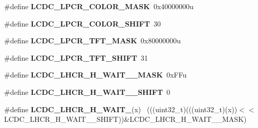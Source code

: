 \begin{DoxyCompactItemize}
\item 
\hypertarget{group___l_c_d_c___register___masks_gadccb426a3edf8c89ea121cc7a1a0bee0}{}\#define {\bfseries L\+C\+D\+C\+\_\+\+L\+P\+C\+R\+\_\+\+C\+O\+L\+O\+R\+\_\+\+M\+A\+S\+K}~0x40000000u\label{group___l_c_d_c___register___masks_gadccb426a3edf8c89ea121cc7a1a0bee0}

\item 
\hypertarget{group___l_c_d_c___register___masks_ga01b98c98ec74fae4a75c3742822b432d}{}\#define {\bfseries L\+C\+D\+C\+\_\+\+L\+P\+C\+R\+\_\+\+C\+O\+L\+O\+R\+\_\+\+S\+H\+I\+F\+T}~30\label{group___l_c_d_c___register___masks_ga01b98c98ec74fae4a75c3742822b432d}

\item 
\hypertarget{group___l_c_d_c___register___masks_gace729a6dbd0a31c98fca8936e1040e5a}{}\#define {\bfseries L\+C\+D\+C\+\_\+\+L\+P\+C\+R\+\_\+\+T\+F\+T\+\_\+\+M\+A\+S\+K}~0x80000000u\label{group___l_c_d_c___register___masks_gace729a6dbd0a31c98fca8936e1040e5a}

\item 
\hypertarget{group___l_c_d_c___register___masks_gaebd495e08e15f8cd18c888f83e993d13}{}\#define {\bfseries L\+C\+D\+C\+\_\+\+L\+P\+C\+R\+\_\+\+T\+F\+T\+\_\+\+S\+H\+I\+F\+T}~31\label{group___l_c_d_c___register___masks_gaebd495e08e15f8cd18c888f83e993d13}

\item 
\hypertarget{group___l_c_d_c___register___masks_ga3563da76663de89cdbccca8e7d50dbf0}{}\#define {\bfseries L\+C\+D\+C\+\_\+\+L\+H\+C\+R\+\_\+\+H\+\_\+\+W\+A\+I\+T\+\_\+\_\+\+M\+A\+S\+K}~0x\+F\+Fu\label{group___l_c_d_c___register___masks_ga3563da76663de89cdbccca8e7d50dbf0}

\item 
\hypertarget{group___l_c_d_c___register___masks_ga064bebe07aaf7b2d7c181cfc5f140641}{}\#define {\bfseries L\+C\+D\+C\+\_\+\+L\+H\+C\+R\+\_\+\+H\+\_\+\+W\+A\+I\+T\+\_\+\_\+\+S\+H\+I\+F\+T}~0\label{group___l_c_d_c___register___masks_ga064bebe07aaf7b2d7c181cfc5f140641}

\item 
\hypertarget{group___l_c_d_c___register___masks_ga3e5e5a4047ee29f49361e804468a405d}{}\#define {\bfseries L\+C\+D\+C\+\_\+\+L\+H\+C\+R\+\_\+\+H\+\_\+\+W\+A\+I\+T\+\_}(x)                                    ~(((uint32\+\_\+t)(((uint32\+\_\+t)(x))$<$$<$L\+C\+D\+C\+\_\+\+L\+H\+C\+R\+\_\+\+H\+\_\+\+W\+A\+I\+T\+\_\+\_\+\+S\+H\+I\+F\+T))\&L\+C\+D\+C\+\_\+\+L\+H\+C\+R\+\_\+\+H\+\_\+\+W\+A\+I\+T\+\_\+\_\+\+M\+A\+S\+K)\label{group___l_c_d_c___register___masks_ga3e5e5a4047ee29f49361e804468a405d}


\end{DoxyCompactItemize}
